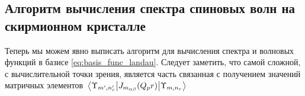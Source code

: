 \documentclass[a4paper,article,14pt]{extarticle}
\begin{document}
\subsection{ Алгоритм вычисления спектра спиновых волн на скирмионном кристалле }

Теперь мы можем явно выписать алгоритм для вычисления спектра и волновых функций в базисе \eqref{eq:basis_func_landau}. Следует заметить, что самой сложной, с вычислительной точки зрения, является часть связанная с получением  значений матричных элементов $\mel{\Upsilon_{m', n'_r}} {J_{m_{\alpha \beta}} (Q_p r) }{\Upsilon_{m, n_r}}$





\pagebreak
{}
\pagebreak
\end{document}
